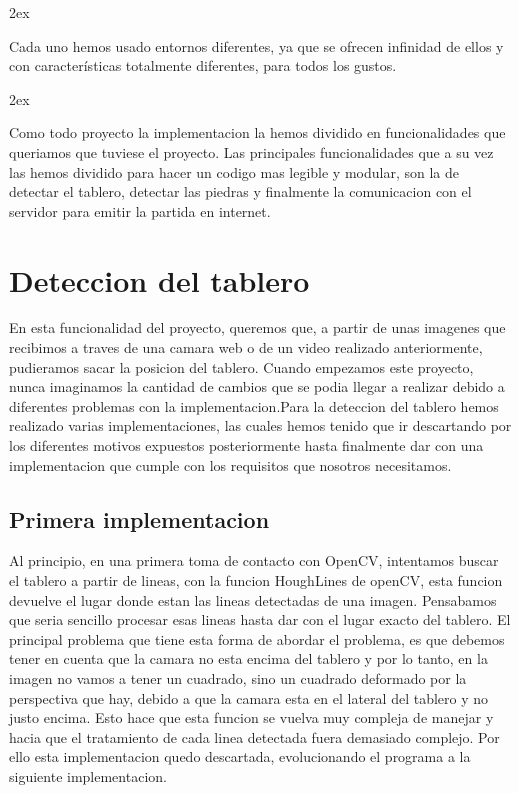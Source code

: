 \documentclass[12pt,a4paper]{report}
\begin{document}
\parskip 2ex

Cada uno hemos usado entornos diferentes, ya que se ofrecen infinidad de ellos y
con características totalmente diferentes, para todos los gustos.

\parskip 2ex

Como todo proyecto la implementacion la hemos dividido en funcionalidades que queriamos que tuviese el proyecto. Las principales funcionalidades que a su vez las hemos dividido para hacer un codigo mas legible y modular, son la de detectar el tablero, detectar las piedras y finalmente la comunicacion con el servidor para emitir la partida en internet.

\section{Deteccion del tablero}
En esta funcionalidad del proyecto, queremos que, a partir de unas imagenes que recibimos a traves de una camara web o de un video realizado anteriormente, pudieramos sacar la posicion del tablero.
Cuando empezamos este proyecto, nunca imaginamos la cantidad de cambios que se podia llegar a realizar debido a diferentes problemas con la implementacion.Para la deteccion del tablero hemos realizado varias implementaciones, las cuales hemos tenido que ir descartando por los diferentes motivos expuestos posteriormente hasta finalmente dar con una implementacion que cumple con los requisitos que nosotros necesitamos.

\subsection{Primera implementacion}
 Al principio, en una primera toma de contacto con OpenCV, intentamos buscar el tablero a partir de lineas, con la funcion HoughLines de openCV, esta funcion devuelve el lugar donde estan las lineas detectadas de una imagen. Pensabamos que seria sencillo procesar esas lineas hasta dar con el lugar exacto del tablero.
 El principal problema que tiene esta forma de abordar el problema, es que debemos tener en cuenta que la camara no esta encima del tablero y por lo tanto, en la imagen no vamos a tener un cuadrado, sino un cuadrado deformado por la perspectiva que hay, debido a que la camara esta en el lateral del tablero y no justo encima. Esto hace que esta funcion se vuelva muy compleja de manejar y hacia que el tratamiento de cada linea detectada fuera demasiado complejo. Por ello esta implementacion quedo descartada, evolucionando el programa a la siguiente implementacion.
 
\end{document}
